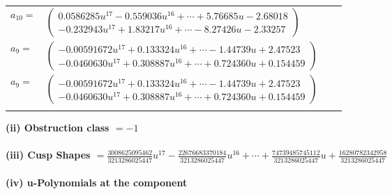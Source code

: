 \documentclass[1p]{elsarticle_modified}
\theoremstyle{definition}
\begin{document}
\begin{tabular}{m{7pt} m{180pt} m{7pt} m{180pt} }
\flushright $a_{10}=$&$\begin{pmatrix}0.0586285 u^{17}-0.559036 u^{16}+\cdots+5.76685 u-2.68018\\-0.232943 u^{17}+1.83217 u^{16}+\cdots-8.27426 u-2.33257\end{pmatrix}$ \\
\flushright $a_{9}=$&$\begin{pmatrix}-0.00591672 u^{17}+0.133324 u^{16}+\cdots-1.44739 u+2.47523\\-0.0460630 u^{17}+0.308887 u^{16}+\cdots+0.724360 u+0.154459\end{pmatrix}$\\ \flushright $a_{9}=$&$\begin{pmatrix}-0.00591672 u^{17}+0.133324 u^{16}+\cdots-1.44739 u+2.47523\\-0.0460630 u^{17}+0.308887 u^{16}+\cdots+0.724360 u+0.154459\end{pmatrix}$\\&\end{tabular}
\flushleft \textbf{(ii) Obstruction class $= -1$}\\~\\
\flushleft \textbf{(iii) Cusp Shapes $= \frac{3008625095462}{3213286025447} u^{17}-\frac{22676683370184}{3213286025447} u^{16}+\cdots+\frac{74739485745112}{3213286025447} u+\frac{16280782342958}{3213286025447}$}\\~\\
\newpage\renewcommand{\arraystretch}{1}
\flushleft \textbf{(iv) u-Polynomials at the component}\newline \\
\end{document}
